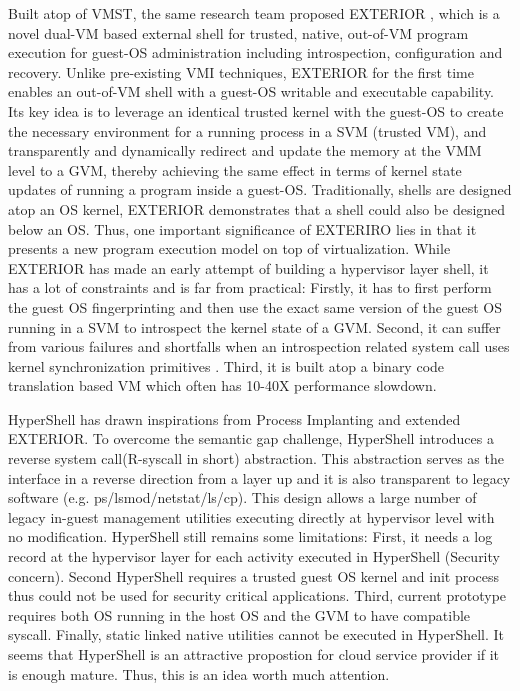Built atop of VMST, the same research team proposed EXTERIOR \cite{Reference29}, which is a novel dual-VM based external shell for trusted, 
native, out-of-VM program execution for guest-OS administration including introspection, configuration and recovery. Unlike pre-existing VMI 
techniques, EXTERIOR for the first time enables an out-of-VM shell with a guest-OS writable and executable capability. Its key idea is to 
leverage an identical trusted kernel with the guest-OS to create the necessary environment for a running process in a SVM (trusted VM), and 
transparently and dynamically redirect and update the memory at the VMM level to a GVM, thereby achieving the same effect in terms of kernel 
state updates of running a program inside a guest-OS. Traditionally, shells are designed atop an OS kernel, EXTERIOR demonstrates that a shell
could also be designed below an OS. Thus, one important significance of EXTERIRO lies in that it presents a new program execution model on top 
of virtualization. While EXTERIOR has made an early attempt of building a hypervisor layer shell, it has a lot of constraints and is far from 
practical: Firstly, it has to first perform the guest OS fingerprinting \cite{Reference30} and then use the exact same version of the guest OS 
running in a SVM to introspect the kernel state of a GVM. Second, it can suffer from various failures and shortfalls when an introspection 
related system call uses kernel synchronization primitives \cite{Reference28}. Third, it is built atop a binary code translation based VM which 
often has 10-40X performance slowdown. 

HyperShell \cite{Reference31} has drawn inspirations from Process Implanting \cite{Reference32} and extended EXTERIOR. To overcome the semantic 
gap challenge, HyperShell introduces a reverse system call(R-syscall in short) abstraction. This abstraction serves as the interface in a 
reverse direction from a layer up and it is also transparent to legacy software (e.g. ps/lsmod/netstat/ls/cp). This design allows a large number
of legacy in-guest management utilities executing directly at hypervisor level with no modification. HyperShell still remains some limitations: 
First, it needs a log record at the hypervisor layer for each activity executed in HyperShell (Security concern). Second HyperShell requires a 
trusted guest OS kernel and init process thus could not be used for security critical applications. Third, current prototype requires both OS 
running in the host OS and the GVM to have compatible syscall. Finally, static linked native utilities cannot be executed in HyperShell.
It seems that HyperShell is an attractive propostion for cloud service provider if it is enough mature. Thus, this is an idea worth much
attention.

